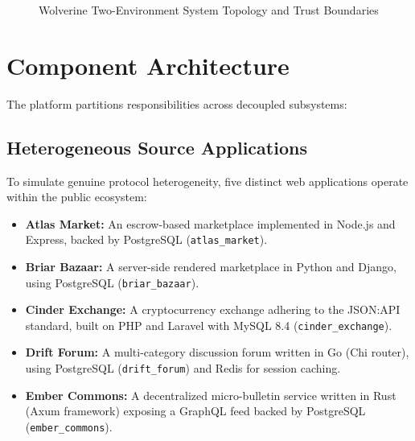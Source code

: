 \begin{figure}[htbp]
\caption{Wolverine Two-Environment System Topology and Trust Boundaries}
\label{fig:env-topology}
\end{figure}

\section{Component Architecture}
\label{sec:arch-components}
The platform partitions responsibilities across decoupled subsystems:

\subsection{Heterogeneous Source Applications}
To simulate genuine protocol heterogeneity, five distinct web applications operate within the public ecosystem:
\begin{itemize}
    \item \textbf{Atlas Market:} An escrow-based marketplace implemented in Node.js and Express, backed by PostgreSQL (\texttt{atlas\_market}).
    \item \textbf{Briar Bazaar:} A server-side rendered marketplace in Python and Django, using PostgreSQL (\texttt{briar\_bazaar}).
    \item \textbf{Cinder Exchange:} A cryptocurrency exchange adhering to the JSON:API standard, built on PHP and Laravel with MySQL 8.4 (\texttt{cinder\_exchange}).
    \item \textbf{Drift Forum:} A multi-category discussion forum written in Go (Chi router), using PostgreSQL (\texttt{drift\_forum}) and Redis for session caching.
    \item \textbf{Ember Commons:} A decentralized micro-bulletin service written in Rust (Axum framework) exposing a GraphQL feed backed by PostgreSQL (\texttt{ember\_commons}).
\end{itemize}

